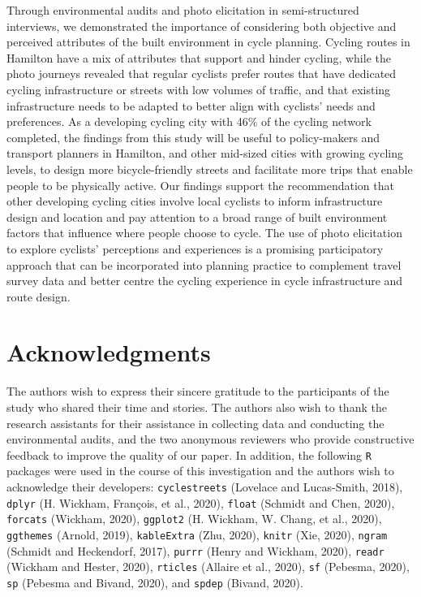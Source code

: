 \documentclass[]{elsarticle} %
\begin{document}
Through environmental audits and photo elicitation in semi-structured
interviews, we demonstrated the importance of considering both objective
and perceived attributes of the built environment in cycle planning.
Cycling routes in Hamilton have a mix of attributes that support and
hinder cycling, while the photo journeys revealed that regular cyclists
prefer routes that have dedicated cycling infrastructure or streets with
low volumes of traffic, and that existing infrastructure needs to be
adapted to better align with cyclists' needs and preferences. As a
developing cycling city with 46\% of the cycling network completed, the
findings from this study will be useful to policy-makers and transport
planners in Hamilton, and other mid-sized cities with growing cycling
levels, to design more bicycle-friendly streets and facilitate more
trips that enable people to be physically active. Our findings support
the recommendation that other developing cycling cities involve local
cyclists to inform infrastructure design and location and pay attention
to a broad range of built environment factors that influence where
people choose to cycle. The use of photo elicitation to explore
cyclists' perceptions and experiences is a promising participatory
approach that can be incorporated into planning practice to complement
travel survey data and better centre the cycling experience in cycle
infrastructure and route design.

\hypertarget{sec:acknowledgments}{%
\section{Acknowledgments}\label{sec:acknowledgments}}

The authors wish to express their sincere gratitude to the participants
of the study who shared their time and stories. The authors also wish to
thank the research assistants for their assistance in collecting data
and conducting the environmental audits, and the two anonymous reviewers
who provide constructive feedback to improve the quality of our paper.
In addition, the following \texttt{R} packages were used in the course
of this investigation and the authors wish to acknowledge their
developers: \texttt{cyclestreets} (Lovelace and Lucas-Smith, 2018),
\texttt{dplyr} (H. Wickham, François, et al., 2020), \texttt{float}
(Schmidt and Chen, 2020), \texttt{forcats} (Wickham, 2020),
\texttt{ggplot2} (H. Wickham, W. Chang, et al., 2020), \texttt{ggthemes}
(Arnold, 2019), \texttt{kableExtra} (Zhu, 2020), \texttt{knitr} (Xie,
2020), \texttt{ngram} (Schmidt and Heckendorf, 2017), \texttt{purrr}
(Henry and Wickham, 2020), \texttt{readr} (Wickham and Hester, 2020),
\texttt{rticles} (Allaire et al., 2020), \texttt{sf} (Pebesma, 2020),
\texttt{sp} (Pebesma and Bivand, 2020), and \texttt{spdep} (Bivand,
2020).
\end{document}

